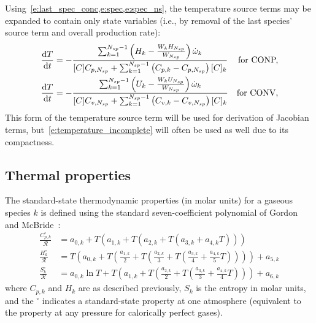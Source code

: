 \documentclass[12pt,number,sort&compress]{elsarticle}
\newcommand{\ns}{N_{sp}}
\newcommand{\conp}{CONP}
\newcommand{\conv}{CONV}
\newcommand{\dconp}{\ifmmode\text{for \conp,}\else for \conp,\fi}
\newcommand{\dconv}{\ifmmode\text{for \conv,}\else for \conv,\fi}
\begin{document}
Using~\cref{e:last_spec_conc,e:spec,e:spec_ns}, the temperature source terms may be expanded to contain only state variables (i.e., by removal of the last species' source term and overall production rate):
\begin{subequations}
\label{e:temperature_complete}
\begin{align}
\frac{\text{d} T }{\text{d} t } &= - \frac{\sum_{k=1}^{\ns  - 1} \left(H_{k} - \frac{W_{k} H_{\ns}}{W_{\ns}}\right) \dot{\omega}_{k}}{[C] {C_{p,\ns}} + \sum_{k=1}^{\ns  - 1} \left({C_{p, k}} - {C_{p,\ns}}\right) [C]_{k}} &\text{\dconp}\\
\frac{\text{d} T }{\text{d} t } &= - \frac{\sum_{k=1}^{\ns  - 1} \left(U_{k} - \frac{W_{k} U_{\ns}}{W_{\ns}}\right) \dot{\omega}_{k}}{[C] {C_{v,\ns}} + \sum_{k=1}^{\ns  - 1} \left({C_{v, k}} - {C_{v,\ns}}\right) [C]_{k}} &\text{\dconv}
\end{align}
\end{subequations}
This form of the temperature source term will be used for derivation of Jacobian terms, but~\cref{e:temperature_incomplete} will often be used as well due to its compactness.

\subsection{Thermal properties}
The standard-state thermodynamic properties (in molar units) for a gaseous species $k$ is defined using the standard seven-coefficient polynomial of Gordon and McBride~\cite{gordon1994computer}:
\begin{align}
\frac{C_{p,k}^{\circ}}{\mathcal{R}} &= a_{0,k} + T \left( a_{1,k} + T \left( a_{2,k} + T \left( a_{3,k} + a_{4,k} T \right) \right) \right) \label{e:cpk} \\
\frac{H_k^{\circ}}{\mathcal{R}} &= T \left( a_{0,k} + T \left( \frac{a_{1,k}}{2} + T \left( \frac{a_{2,k}}{3} + T \left( \frac{a_{3,k}}{4} + \frac{a_{4,k}}{5} T \right) \right) \right) \right) + a_{5,k} \label{e:hk} \\
\frac{S_k^{\circ}}{\mathcal{R}} &= a_{0,k} \ln T + T \left( a_{1,k} + T \left( \frac{a_{2,k}}{2} + T \left( \frac{a_{3,k}}{3} + \frac{a_{4,k}}{4} T \right) \right) \right) + a_{6,k} \label{e:sk}
\end{align}
where $C_{p,k}$ and $H_k$ are as described previously, $S_k$ is the entropy in molar units, and the ${}^{\circ}$ indicates a standard-state property at one atmosphere (equivalent to the property at any pressure for calorically perfect gases).
\end{document}
